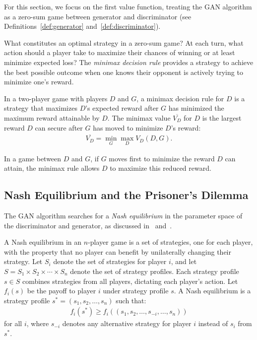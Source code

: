\begin{remark}
	For this section, we focus on the first value function, treating the GAN algorithm as a zero-sum game between generator and discriminator (see Definitions~\ref{def:generator} and~\ref{def:discriminator}).
\end{remark}

What constitutes an optimal strategy in a zero-sum game? At each turn, what action should a player take to maximize their chances of winning or at least minimize expected loss? The \textit{minimax decision rule} provides a strategy to achieve the best possible outcome when one knows their opponent is actively trying to minimize one's reward.

\begin{definition}
	\label{def:minimax}
	\label{def:minimax-value}
	In a two-player game with players $D$ and $G$, a \textnormal{\sffamily
		minimax decision rule} for $D$ is a strategy that maximizes $D$'s expected
	reward after $G$ has minimized the maximum reward attainable by $D$. The
	\textnormal{\sffamily minimax value} $\overline{V_D}$ for $D$ is the
	largest reward $D$ can secure after $G$ has moved to minimize $D$'s reward:
	\begin{align}
		\overline{V_D} = \min_{G} \max_{D} V_D(D, G).
	\end{align}
\end{definition}

In a game between $D$ and $G$, if $G$ moves first to minimize the reward $D$ can attain, the minimax rule allows $D$ to maximize this reduced reward.

\subsection{Nash Equilibrium and the Prisoner's Dilemma}
\label{sec:nash-dilemma}

The GAN algorithm searches for a \textit{Nash equilibrium} in the parameter space of the discriminator and generator, as discussed in~\cite{ref:goodfellow-2016} and~\cite{ref:goodfellow-2017}.

\begin{definition}
	A \textnormal{\sffamily Nash equilibrium} in an $n$-player game is a
	set of strategies, one for each player, with the property that no
	player can benefit by unilaterally changing their strategy. Let $S_i$ denote the set of strategies for player $i$, and let $S = S_1 \times S_2 \times \cdots \times S_n$ denote the set of strategy profiles. Each strategy profile $s \in S$ combines strategies from all players, dictating each player's action. Let $f_i(s)$ be the payoff to player $i$ under strategy profile $s$. A Nash equilibrium is a strategy profile $s^* = (s_1, s_2, \dots, s_n)$ such that:
	\begin{align}
		f_i(s^*) \geq f_i((s_1, s_2, \dots, s_{-i}, \dots, s_n))
	\end{align}
	for all $i$, where $s_{-i}$ denotes any alternative strategy for player $i$ instead of $s_i$ from $s^*$.
\end{definition}

